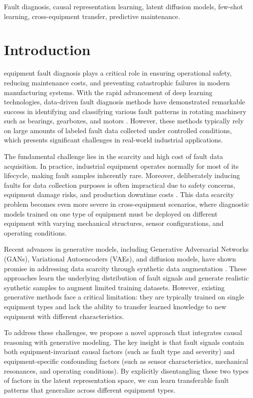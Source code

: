 \documentclass[lettersize,journal]{IEEEtran}
\begin{document}
\begin{IEEEkeywords}
Fault diagnosis, causal representation learning, latent diffusion models, few-shot learning, cross-equipment transfer, predictive maintenance.
\end{IEEEkeywords}

\section{Introduction}
 equipment fault diagnosis plays a critical role in ensuring operational safety, reducing maintenance costs, and preventing catastrophic failures in modern manufacturing systems. With the rapid advancement of deep learning technologies, data-driven fault diagnosis methods have demonstrated remarkable success in identifying and classifying various fault patterns in rotating machinery such as bearings, gearboxes, and motors \cite{ref22,ref23}. However, these methods typically rely on large amounts of labeled fault data collected under controlled conditions, which presents significant challenges in real-world industrial applications.

The fundamental challenge lies in the scarcity and high cost of fault data acquisition. In practice, industrial equipment operates normally for most of its lifecycle, making fault samples inherently rare. Moreover, deliberately inducing faults for data collection purposes is often impractical due to safety concerns, equipment damage risks, and production downtime costs \cite{ref24,ref25}. This data scarcity problem becomes even more severe in cross-equipment scenarios, where diagnostic models trained on one type of equipment must be deployed on different equipment with varying mechanical structures, sensor configurations, and operating conditions.

Recent advances in generative models, including Generative Adversarial Networks (GANs), Variational Autoencoders (VAEs), and diffusion models, have shown promise in addressing data scarcity through synthetic data augmentation \cite{ref1,ref6,ref8}. These approaches learn the underlying distribution of fault signals and generate realistic synthetic samples to augment limited training datasets. However, existing generative methods face a critical limitation: they are typically trained on single equipment types and lack the ability to transfer learned knowledge to new equipment with different characteristics.

To address these challenges, we propose a novel approach that integrates causal reasoning with generative modeling. The key insight is that fault signals contain both equipment-invariant causal factors (such as fault type and severity) and equipment-specific confounding factors (such as sensor characteristics, mechanical resonances, and operating conditions). By explicitly disentangling these two types of factors in the latent representation space, we can learn transferable fault patterns that generalize across different equipment types.
\end{document}

